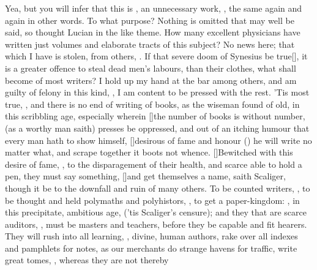 {Yea, but you will infer that this is , an unnecessary
work, , the same again and again in other
words. To what purpose? Nothing is omitted that may well be said,
so thought Lucian in the like theme. How many excellent physicians have
written just volumes and elaborate tracts of this subject? No news
here; that which I have is stolen, from others, . If that severe doom of Synesius be true[\baselineskip], it is a
greater offence to steal dead men's labours, than their clothes, what
shall become of most writers? I hold up my hand at the bar among
others, and am guilty of felony in this kind, , I
am content to be pressed with the rest. 'Tis most true, , and there is no end of
writing of books, as the wiseman found of old, in this scribbling
age, especially wherein [\baselineskip]the number of books is without number, (as
a worthy man saith) presses be oppressed, and out of an itching humour
that every man hath to show himself, [\baselineskip]desirous of fame and honour
() he will write no matter what, and scrape
together it boots not whence. [\baselineskip]Bewitched with this desire of fame,
, to the disparagement of their health, and
scarce able to hold a pen, they must say something, [\baselineskip]and get
themselves a name, saith Scaliger, though it be to the downfall and
ruin of many others. To be counted writers, ,
to be thought and held polymaths and polyhistors, , to get a paper-kingdom: , in this precipitate, ambitious age,  ('tis
Scaliger's censure); and they that are scarce auditors, , must be masters and teachers, before they be capable and fit
hearers. They will rush into all learning, , divine,
human authors, rake over all indexes and pamphlets for notes, as our
merchants do strange havens for traffic, write great tomes, , whereas they are not thereby
}
